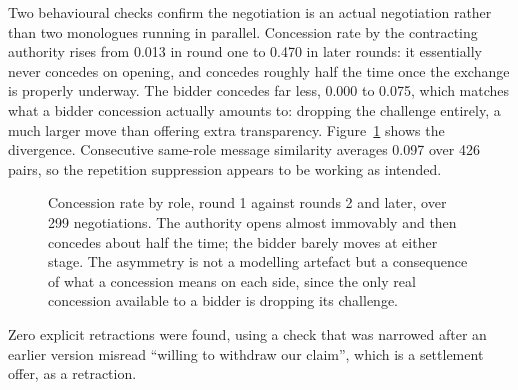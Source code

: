 Two behavioural checks confirm the negotiation is an actual negotiation rather
than two monologues running in parallel. Concession rate by the contracting
authority rises from 0.013 in round one to 0.470 in later rounds: it essentially
never concedes on opening, and concedes roughly half the time once the exchange
is properly underway. The bidder concedes far less, 0.000 to 0.075, which
matches what a bidder concession actually amounts to: dropping the challenge
entirely, a much larger move than offering extra transparency.
Figure~\ref{fig:concession} shows the divergence.
Consecutive same-role message similarity averages 0.097 over 426 pairs, so the
repetition suppression appears to be working as intended.

\begin{figure}[htbp]
\centering
{}
\caption[Concession dynamics]{Concession rate by role, round 1 against rounds 2
and later, over 299 negotiations. The authority opens almost immovably and then
concedes about half the time; the bidder barely moves at either stage. The
asymmetry is not a modelling artefact but a consequence of what a concession
means on each side, since the only real concession available to a bidder is
dropping its challenge.}
\label{fig:concession}
\end{figure} Zero explicit
retractions were found, using a check that was narrowed after an earlier version
misread ``willing to withdraw our claim'', which is a settlement offer, as a
retraction.

